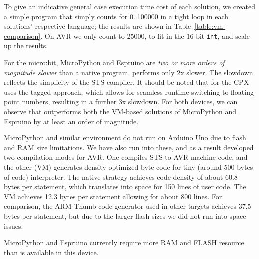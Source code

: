 To give an indicative general case execution time cost of each solution, we created a simple program that simply
counts for 0..100000 in a tight loop in each solutions' respective language;
the results are shown in Table~\ref{table:vm-comparison}.
On AVR we only count to 25000, to fit in the 16 bit \texttt{int}, and scale up the results.

For the micro:bit, MicroPython and Espruino are \emph{two or more orders of magnitude slower} than a native \CO program.
\MC performs only 2x slower. The slowdown reflects the simplicity of the STS compiler.
It should be noted that \MC for the CPX uses the tagged approach, which allows for seamless runtime switching to floating point numbers,
resulting in a further 3x slowdown. For both devices, we can observe that \MC outperforms both the VM-based solutions of MicroPython and
Espruino by at least an order of magnitude.

MicroPython and similar environment do not run on Arduino Uno due to flash and RAM size limitations.
We have also run into these, and as a result developed two compilation modes for AVR.
One compiles STS to AVR machine code, and the other (\MC VM) generates density-optimized byte code for
tiny (around 500 bytes of code) interpreter.
The native strategy achieves code density of about 60.8 bytes per statement,
which translates into space for 150 lines of user code.
The VM achieves 12.3 bytes per statement allowing for about 800 lines.
For comparison, the ARM Thumb code generator used in other targets achieves
37.5 bytes per statement, but due to the larger flash sizes we did not run
into space issues.


MicroPython and Espruino currently require more RAM and FLASH resource than is available in this device.

